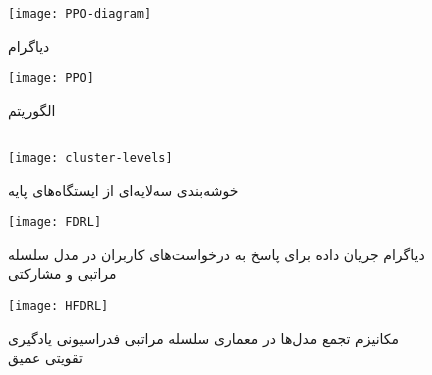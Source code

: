 \begin{figure}[ht]
	\centerline{\texttt{[image: PPO-diagram]}}
	\caption{دیاگرام }
	\label{fig:ppod}
\end{figure}

\begin{figure}[ht]
	\centerline{\texttt{[image: PPO]}}
	\caption{الگوریتم }
	\label{fig:ppo}
\end{figure}

\subsection{}


\begin{figure}[ht]
	\centerline{\texttt{[image: cluster-levels]}}
	\caption{خوشه‌بندی سه‌لایه‌ای از ایستگاه‌های پایه}
	\label{fig:cluster-levels}
\end{figure}

\begin{figure}[ht]
	\centerline{\texttt{[image: FDRL]}}
	\caption{دیاگرام جریان داده برای پاسخ به درخواست‌های کاربران در مدل سلسله مراتبی و مشارکتی}
	\label{fig:fdrl}
\end{figure}

\begin{figure}[ht]
	\centerline{\texttt{[image: HFDRL]}}
	\caption{مکانیزم تجمع مدل‌ها در معماری سلسله مراتبی فدراسیونی یادگیری تقویتی عمیق}
	\label{fig:hfdrl}
\end{figure}

